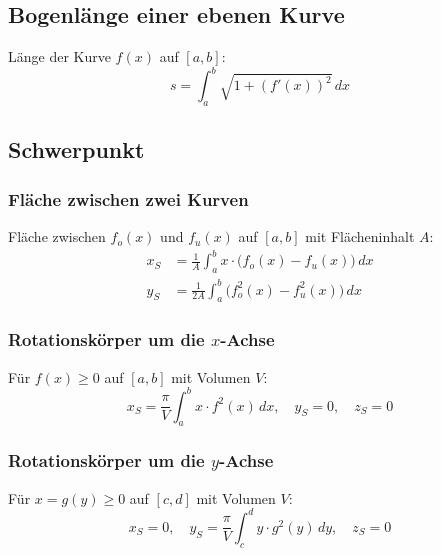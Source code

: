 \subsection{Bogenlänge einer ebenen Kurve}
Länge der Kurve \(f(x)\) auf \([a,b]\):
\[
    s = \int_a^b \sqrt{1+(f'(x))^2}\,dx
\]

\subsection{Schwerpunkt}

\subsubsection{Fläche zwischen zwei Kurven}
Fläche zwischen \(f_o(x)\) und \(f_u(x)\) auf \([a,b]\) mit Flächeninhalt \(A\):
\begin{align*}
    x_S &= \frac{1}{A}\int_a^b x\cdot\bigl(f_o(x)-f_u(x)\bigr)\,dx \\
    y_S &= \frac{1}{2A}\int_a^b \bigl(f_o^2(x)-f_u^2(x)\bigr)\,dx
\end{align*}

\subsubsection{Rotationskörper um die \(x\)-Achse}
Für \(f(x)\geq 0\) auf \([a,b]\) mit Volumen \(V\):
\[
    x_S = \frac{\pi}{V}\int_a^b x\cdot f^2(x)\,dx, \quad y_S=0,\quad z_S=0
\]

\subsubsection{Rotationskörper um die \(y\)-Achse}
Für \(x=g(y)\geq 0\) auf \([c,d]\) mit Volumen \(V\):
\[
    x_S = 0, \quad y_S = \frac{\pi}{V}\int_c^d y\cdot g^2(y)\,dy, \quad z_S=0
\]